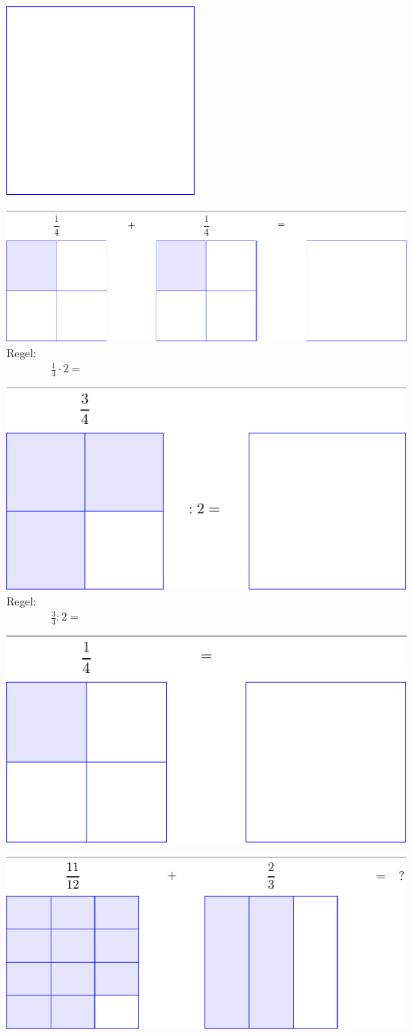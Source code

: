 \documentclass[english, 12 pt]{report}
\newcommand{\vs}{\\ \includegraphics[]{lina} \\[5 pt]}
\begin{document}
	\includegraphics[]{br1}
	\vs
	\includegraphics[]{br4}  \\[12 pt]
	Regel:\\ \vspace{5pt}
	$\qquad\qquad\displaystyle \frac{1}{4}\cdot2 =  $
	\vs
	\includegraphics[]{br5b} \\[12 pt]
Regel:\\ \vspace{5pt}
$\qquad\qquad\displaystyle \frac{3}{4}:2 =  $	
	\vs
	\includegraphics[]{br6}
	\vs
	\includegraphics[]{br7}	
				
\end{document}
